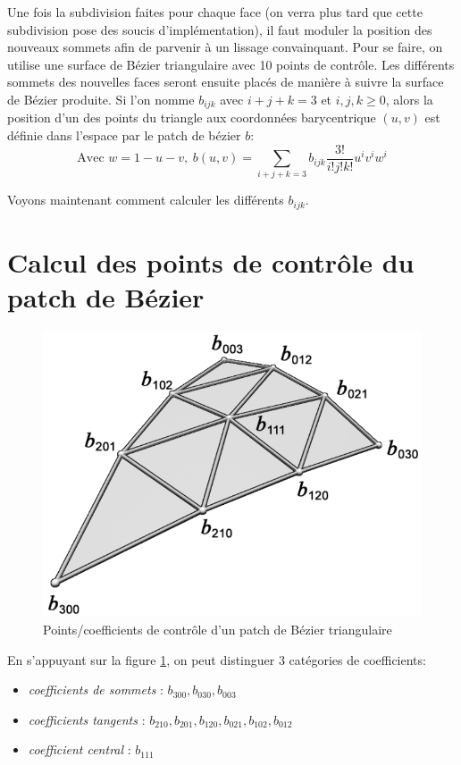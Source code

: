 \documentclass{article}
\begin{document}
Une fois la subdivision faites pour chaque face (on verra plus tard que cette
subdivision pose des soucis d'implémentation), il faut moduler la position des
nouveaux sommets afin de parvenir à un lissage convainquant. Pour se faire, on
utilise une surface de Bézier triangulaire avec 10 points de contrôle. Les
différents sommets des nouvelles faces seront ensuite placés de manière à
suivre la surface de Bézier produite. Si l'on nomme $b_{ijk}$ avec $i+j+k = 3$
et $i,j,k\geq 0$, alors la position d'un des points du triangle aux coordonnées
barycentrique $(u,v)$ est définie dans l'espace par le patch de bézier $b$:
\begin{equation}
    \textrm{Avec } w = 1 - u - v,\hspace{3pt} b(u,v) = \sum_{i+j+k=3} b_{ijk} \frac{3!}{i!j!k!}u^i v^i w^i
\end{equation}

Voyons maintenant comment calculer les différents $b_{ijk}$.

\section{Calcul des points de contrôle du patch de Bézier}

\begin{figure}[ht!]
\centering
    \includegraphics[width=0.4\linewidth]{control-points}
    \caption{Points/coefficients de contrôle d'un patch de Bézier triangulaire}
    \label{fig:control-points}
\end{figure}

En s'appuyant sur la figure \ref{fig:control-points}, on peut distinguer 3
catégories de coefficients:

\begin{itemize}
    \item \textit{coefficients de sommets} : $b_{300}, b_{030}, b_{003}$
    \item \textit{coefficients tangents} : $b_{210}, b_{201}, b_{120},
b_{021}, b_{102}, b_{012}$
    \item \textit{coefficient central} : $b_{111}$
\end{itemize}
\end{document}
